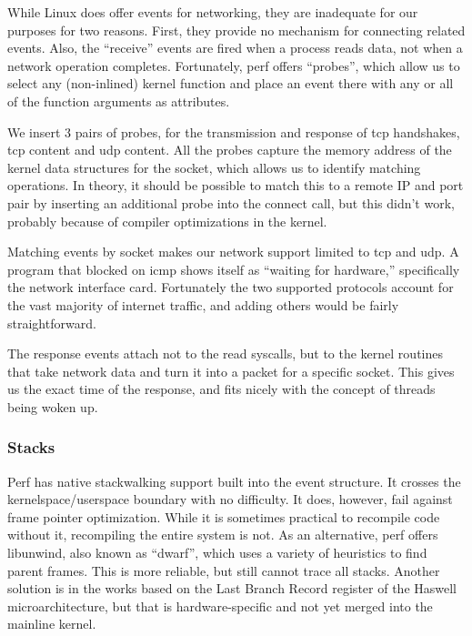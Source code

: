 \documentclass[10pt]{article}
\begin{document}
While Linux does offer events for networking, they are inadequate for our purposes for two reasons.  First, they provide no mechanism for connecting related events.  Also, the ``receive'' events are fired when a process reads data, not when a network operation completes.  Fortunately, perf offers ``probes'', which allow us to select any (non-inlined) kernel function and place an event there with any or all of the function arguments as attributes.

We insert 3 pairs of probes, for the transmission and response of tcp handshakes, tcp content and udp content.  All the probes capture the memory address of the kernel data structures for the socket, which allows us to identify matching operations.  In theory, it should be possible to match this to a remote IP and port pair by inserting an additional probe into the connect call, but this didn't work, probably because of compiler optimizations in the kernel.  

Matching events by socket makes our network support limited to tcp and udp.  A program that blocked on icmp shows itself as ``waiting for hardware,'' specifically the network interface card.  Fortunately the two supported protocols account for the vast majority of internet traffic, and adding others would be fairly straightforward.

The response events attach not to the read syscalls, but to the kernel routines that take network data and turn it into a packet for a specific socket.  This gives us the exact time of the response, and fits nicely with the concept of threads being woken up.

\subsubsection{Stacks}

Perf has native stackwalking support built into the event structure.  It crosses the kernelspace/userspace boundary with no difficulty.  It does, however, fail against frame pointer optimization.  While it is sometimes practical to recompile code without it, recompiling the entire system is not.  As an alternative, perf offers libunwind, also known as ``dwarf'', which uses a variety of heuristics to find parent frames.  This is more reliable, but still cannot trace all stacks.  Another solution is in the works based on the Last Branch Record register of the Haswell microarchitecture, but that is hardware-specific and not yet merged into the mainline kernel.\cite{lbr}
\end{document}
